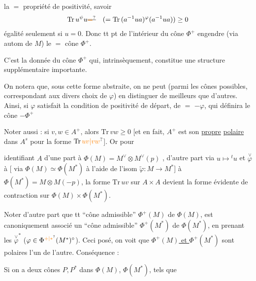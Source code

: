 la $=$ propriété de positivité, savoir
\[
\mathrm{Tr}\,u^\psi u\deleted{\unsure{=}}\quad(=\mathrm{Tr}\,(a^{-1}ua)^\varphi(a^{-1}ua))\geq0
\]
égalité seulement si $u=0$. Donc tt pt de
l'intérieur du cône  $\Phi^+$ engendre
(via autom de $M$) le $=$ cône $\Phi^+$.

C'est la donnée du cône $\Phi^+$ qui,
intrinsèquement, constitue une structure
supplémentaire importante.

On notera que, sous cette forme abstraite,
on ne peut (parmi les cônes possibles,
correspondant aux divers choix de $\varphi$)
en distinguer de meilleurs que d'autres.
Ainsi, si $\varphi$ satisfait la condition de
positivité de départ, de $=$ $-\varphi$, qui
définira le cône $-\Phi^+$

Noter aussi :  si $v,w\in A^+$,
alors $\mathrm{Tr}\,vw\geq0$ [et
en fait, $A^+$ est son \uline{propre} \uline{polaire} dans
$A^s$  pour la forme $\mathrm{Tr}\,\unsure{uv|vw}$]. Or pour

identifiant $A$ d'une part à
$\Phi(M)=M^\vee\otimes M^\vee(p)$ , d'autre part via
\deleted{\unsure{$\varphi$}} $u\mapsto{}^tu$ et $\overset{\vee}{\varphi}$ à [ via $\Phi(M)\simeq\Phi(M^{*})$
à l'aide de l'isom $\widetilde\varphi:M\longrightarrow M^*$] à
$\Phi(M^*)=M\otimes M(-p)$, la forme $\mathrm{Tr}\,uv$
sur $A\times A$ devient la forme évidente
de contraction sur $\Phi(M)\times\Phi(M^*)$.

Noter d'autre part que   tt ``cône
 admissible'' $\Phi^+(M)$ de $\Phi(M)$,
est canoniquement associé un ``cône admissible''
$\Phi^+(M^*)$ de $\Phi(M^*)$, en prenant les
$\overset{\vee}{\varphi}^*$ ($\varphi\in\Phi^{\unsure{+|*}}(M^*)^\circ$). Ceci posé, on voit
que \uline{$\Phi^+(M)$ et $\Phi^+(M^*)$} sont
polaires l'un de l'autre. Conséquence :

Si on a deux cônes   $P,P^*$ dans
$\Phi(M)$, $\Phi(M^*)$,  tels que

